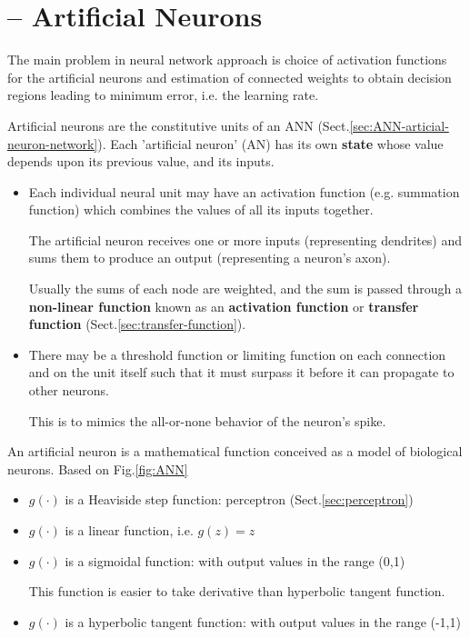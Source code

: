 \section{-- Artificial Neurons}
\label{sec:artificial-neurons}

The main problem in neural network approach is choice of activation
functions for the artificial neurons and estimation of connected weights to
obtain decision regions leading to minimum error, i.e. the learning rate.

Artificial neurons are the constitutive units of an ANN
(Sect.\ref{sec:ANN-articial-neuron-network}). Each 'artificial neuron' (AN) has
its own {\bf state} whose value depends upon its previous value, and its inputs. 
\begin{itemize}
  \item Each individual neural unit may have an activation function 
  (e.g. summation
  function) which combines the values of all its inputs together.

The artificial neuron receives one or more inputs (representing dendrites) and
sums them to produce an output (representing a neuron's axon).

Usually the sums of each node are weighted, and the sum is passed through a {\bf
non-linear function} known as an {\bf activation function} or {\bf transfer
function} (Sect.\ref{sec:transfer-function}).

  \item   There may be a threshold function or limiting function on each
  connection and on the unit itself such that it must surpass it before it can
  propagate to other neurons.  
  
This is to mimics the all-or-none behavior of the neuron's spike.
  
\end{itemize}

An artificial neuron is a mathematical function conceived as a model of
biological neurons. Based on Fig.\ref{fig:ANN}
\begin{itemize}
  \item $g(\cdot)$	 is a Heaviside step function: perceptron
  (Sect.\ref{sec:perceptron})
  
  \item $g(\cdot)$ is a linear function, i.e. $g(z) = z$
  
  \item $g(\cdot)$ is a sigmoidal function: with output values in the range
  (0,1)
  
This function is easier to take derivative than hyperbolic tangent function.
   
  \item $g(\cdot)$ is a hyperbolic tangent function: with output values in the
  range (-1,1)
  
\end{itemize}



